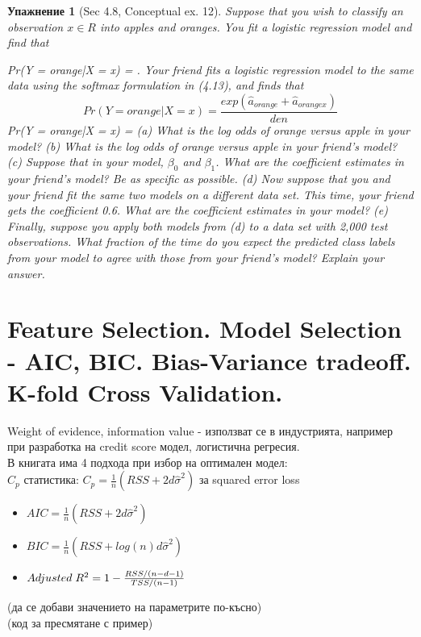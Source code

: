\documentclass{article}
\newtheorem{exercise}[subsubsection]{Упажнение}
\begin{document}
	\begin{exercise}[Sec 4.8, Conceptual ex. 12]
	Suppose that you wish to classify an observation $x \in R $ into apples
	and oranges. You fit a logistic regression model and find that
	
	Pr(Y = orange|X = x) =
	.
	Your friend fits a logistic regression model to the same data using the
	softmax formulation in (4.13), and finds that
	$$Pr(Y= orange| X=x) = \frac{exp(\hat{a}_{orange} + \hat{a}_{orangex}) }{den}$$
	Pr(Y = orange|X = x) =
	(a) What is the log odds of orange versus apple in your model?
	(b) What is the log odds of orange versus apple in your friend’s
	model?
	(c) Suppose that in your model, $\beta_0$ and $\beta_1$. What are
	the coefficient estimates in your friend’s model? Be as specific
	as possible.
	(d) Now suppose that you and your friend fit the same two models
	on a different data set. This time, your friend gets the coefficient
	0.6. What are the coefficient estimates in your model?
	(e) Finally, suppose you apply both models from (d) to a data set
	with 2,000 test observations. What fraction of the time do you
	expect the predicted class labels from your model to agree with
	those from your friend’s model? Explain your answer. \\
	\end{exercise}


	
	
	
	\newpage
	\section{Feature Selection. Model Selection - AIC, BIC. Bias-Variance tradeoff. K-fold Cross Validation.} 
	Weight of evidence, information value - използват се в индустрията, например при разработка на credit score модел, логистична регресия. \\
	В книгата има 4 подхода при избор на оптимален модел: \\
	$C_p$ статистика: $C_p = \frac{1}{n}(RSS + 2d \hat \sigma^2)$ за squared error loss
	\begin{itemize}
		\item $AIC = \frac{1}{n}(RSS + 2d \hat \sigma^2)$
		\item $BIC = \frac{1}{n}(RSS + log(n) d \hat \sigma^2)$
		\item $Adjusted \hspace{0.1cm} R^2 = 1 - \frac{RSS/(n-d-1)}{TSS/(n-1)} $
	\end{itemize}
	(да се добави значението на параметрите по-късно) \\
	(код за пресмятане с пример) \\
	
\end{document}

